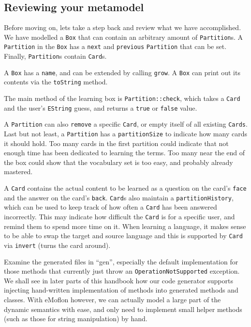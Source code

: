 \newpage 
\genHeader
\subsection{Reviewing your metamodel}
\hypertarget{static review}{}

Before moving on, lets take a step back and review what we have accomplished. We have modelled a \texttt{Box} that can contain an arbitrary amount of
\texttt{Partition}s. A \texttt{Partition} in the \texttt{Box} has a \texttt{next} and \texttt{previous} \texttt{Partition} that can be set. Finally,
\texttt{Partition}s contain \texttt{Card}s.

A \texttt{Box} has a \texttt{name}, and can be extended by calling \texttt{grow}. A \texttt{Box} can print out its contents via the \texttt{toString} method.

The main method of the learning box is \texttt{Partition::check}, which takes a \texttt{Card} and the user's \texttt{EString} guess, and returns a \texttt{true}
or \texttt{false} value.

A \texttt{Partition} can also \texttt{remove} a specific \texttt{Card}, or empty itself of all  existing \texttt{Cards}. Last but not least, a
\texttt{Partition} has a \texttt{partitionSize} to indicate how many cards it should hold. Too many cards in the first partition could indicate that not
enough time has been dedicated to learning the terms. Too many near the end of the box could show that the vocabulary set is too easy, and probably
already mastered.

A \texttt{Card} contains the actual content to be learned as a question on the card's \texttt{face} and the answer on the card's \texttt{back}. \texttt{Card}s
also maintain a \texttt{partition\-History}, which can be used to keep track of how often a \texttt{Card} has been answered incorrectly.
This may indicate how difficult the \texttt{Card} is for a specific user, and remind them to spend more time on it. When learning a language, it makes
sense to be able to swap the target and source language and this is supported by \texttt{Card} via \texttt{invert} (turns the card around).

Examine the generated files in ``gen'', especially the default implementation for those methods that currently just throw an \texttt{OperationNotSupported}
exception. We shall see in later parts of this handbook how our code generator supports injecting hand-written implementation of methods into generated methods
and classes. With eMoflon however, we can actually model a large part of the dynamic semantics with ease, and only need to implement small helper methods (such
as those for string manipulation) by hand.


